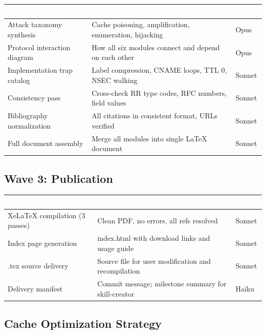 \documentclass[11pt,letterpaper]{article}
\newcommand{\tableheader}[1]{\textbf{\sffamily\textcolor{white}{#1}}}
\begin{document}
\begin{center}
\begin{tabularx}{\textwidth}{L{4.5cm}XC{1.8cm}}
\toprule
{}
\tableheader{Task} & \tableheader{Deliverable} & \tableheader{Model} \\
\midrule
Attack taxonomy synthesis & Cache poisoning, amplification, enumeration, hijacking & Opus \\
Protocol interaction diagram & How all six modules connect and depend on each other & Opus \\
Implementation trap catalog & Label compression, CNAME loops, TTL 0, NSEC walking & Sonnet \\
Consistency pass & Cross-check RR type codes, RFC numbers, field values & Sonnet \\
Bibliography normalization & All citations in consistent format, URLs verified & Sonnet \\
Full document assembly & Merge all modules into single LaTeX document & Sonnet \\
\bottomrule
\end{tabularx}
\end{center}

\subsection{Wave 3: Publication}

\begin{center}
\begin{tabularx}{\textwidth}{L{4cm}XC{1.8cm}}
\toprule
{}
\tableheader{Task} & \tableheader{Deliverable} & \tableheader{Model} \\
\midrule
XeLaTeX compilation (3 passes) & Clean PDF, no errors, all refs resolved & Sonnet \\
Index page generation & index.html with download links and usage guide & Sonnet \\
.tex source delivery & Source file for user modification and recompilation & Sonnet \\
Delivery manifest & Commit message; milestone summary for skill-creator & Haiku \\
\bottomrule
\end{tabularx}
\end{center}

\subsection{Cache Optimization Strategy}
\end{document}
